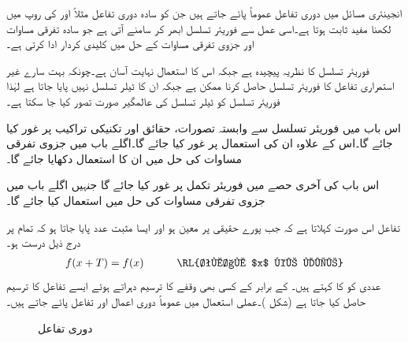 انجینئری مسائل میں دوری تفاعل عموماً پائے جاتے ہیں جن کو سادہ دوری تفاعل مثلاً  اور  کی روپ میں لکھنا مفید ثابت ہوتا ہے۔اسی عمل سے فوریئر تسلسل ابھر کر سامنے آتی ہے جو سادہ تفرقی مساوات اور جزوی تفرقی مساوات کے حل میں کلیدی کردار ادا کرتی ہے۔

فوریئر تسلسل کا نظریہ پیچیدہ ہے جبکہ اس کا استعمال نہایت آسان  ہے۔چونکہ بہت سارے غیر استمراری تفاعل کا فوریئر تسلسل حاصل کرنا ممکن ہے جبکہ ان کا ٹیلر تسلسل نہیں پایا جاتا ہے لہٰذا فوریئر تسلسل کو ٹیلر تسلسل کی عالمگیر صورت تصور کیا جا سکتا ہے۔

اس باب میں فوریئر تسلسل سے وابستہ تصورات، حقائق اور تکنیکی تراکیب پر غور کیا جائے گا۔اس کے علاوہ ان کی استعمال پر غور کیا جائے گا۔اگلے باب میں جزوی تفرقی مساوات کی حل میں ان کا استعمال دکھایا جائے گا۔

اس باب کی آخری حصے میں فوریئر تکمل پر غور کیا جائے گا جنہیں اگلے باب میں جزوی تفرقی مساوات کی حل میں استعمال کیا جائے گا۔

تفاعل  اس صورت  کہلاتا ہے کہ جب پورے حقیقی  پر  معین ہو اور ایسا مثبت عدد  پایا جاتا ہو کہ تمام  پر درج ذیل درست ہو۔
\begin{align}\label{مساوات_فوریئر_دوری_تعریف_الف}
f(x+T)=f(x)\quad \quad \quad \text{\RL{تمام $x$ کے لیے}}
\end{align} 
عددی  کو  کا  کہتے ہیں۔ کے برابر   کے کسی بھی وقفے کا ترسیم دہراتے ہوئے ایسے تفاعل کا ترسیم حاصل کیا جاتا ہے (شکل )۔عملی استعمال میں عموماً  دوری اعمال اور تفاعل  پائے جاتے ہیں۔
\begin{figure}
\centering
{}
\caption{دوری تفاعل}
\label{شکل_فوریئر_دوری_تفاعل}
\end{figure} 

